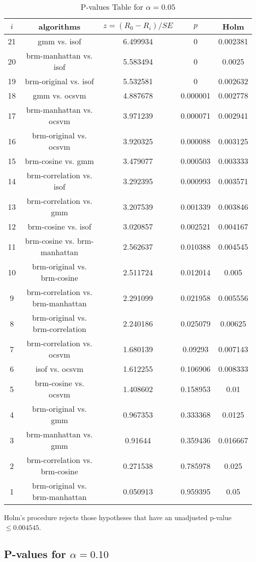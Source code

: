 \documentclass[a4paper,10pt]{article}
\begin{document}
\begin{landscape}
\begin{table}[!htp]
\centering\scriptsize
\begin{tabular}{ccccc}
$i$&algorithms&$z=(R_0 - R_i)/SE$&$p$&Holm\\
\hline21&gmm vs. isof&6.499934&0&0.002381\\
20&brm-manhattan vs. isof&5.583494&0&0.0025\\
19&brm-original vs. isof&5.532581&0&0.002632\\
18&gmm vs. ocsvm&4.887678&0.000001&0.002778\\
17&brm-manhattan vs. ocsvm&3.971239&0.000071&0.002941\\
16&brm-original vs. ocsvm&3.920325&0.000088&0.003125\\
15&brm-cosine vs. gmm&3.479077&0.000503&0.003333\\
14&brm-correlation vs. isof&3.292395&0.000993&0.003571\\
13&brm-correlation vs. gmm&3.207539&0.001339&0.003846\\
12&brm-cosine vs. isof&3.020857&0.002521&0.004167\\
11&brm-cosine vs. brm-manhattan&2.562637&0.010388&0.004545\\
10&brm-original vs. brm-cosine&2.511724&0.012014&0.005\\
9&brm-correlation vs. brm-manhattan&2.291099&0.021958&0.005556\\
8&brm-original vs. brm-correlation&2.240186&0.025079&0.00625\\
7&brm-correlation vs. ocsvm&1.680139&0.09293&0.007143\\
6&isof vs. ocsvm&1.612255&0.106906&0.008333\\
5&brm-cosine vs. ocsvm&1.408602&0.158953&0.01\\
4&brm-original vs. gmm&0.967353&0.333368&0.0125\\
3&brm-manhattan vs. gmm&0.91644&0.359436&0.016667\\
2&brm-correlation vs. brm-cosine&0.271538&0.785978&0.025\\
1&brm-original vs. brm-manhattan&0.050913&0.959395&0.05\\
\hline
\end{tabular}
\caption{P-values Table for $\alpha=0.05$}
\end{table}Holm's procedure rejects those hypotheses that have an unadjusted p-value $\le0.004545$.

\pagebreak

\subsection{P-values for $\alpha=0.10$}


\end{landscape}
\end{document}
